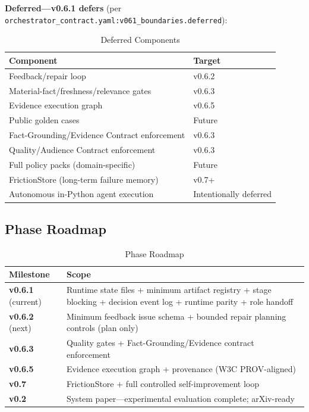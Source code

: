 \documentclass[11pt,a4paper]{article}
\begin{document}
\textbf{Deferred---v0.6.1 defers} (per \texttt{orchestrator\_contract.yaml:v061\_boundaries.deferred}):

\begin{table}[ht]
\centering
\caption{Deferred Components}
\label{tab:deferred}
\begin{tabular}{@{}ll@{}}
\toprule
\textbf{Component} & \textbf{Target} \\
\midrule
Feedback/repair loop & v0.6.2 \\
Material-fact/freshness/relevance gates & v0.6.3 \\
Evidence execution graph & v0.6.5 \\
Public golden cases & Future \\
Fact-Grounding/Evidence Contract enforcement & v0.6.3 \\
Quality/Audience Contract enforcement & v0.6.3 \\
Full policy packs (domain-specific) & Future \\
FrictionStore (long-term failure memory) & v0.7+ \\
Autonomous in-Python agent execution & Intentionally deferred \\
\bottomrule
\end{tabular}
\end{table}

\subsection{Phase Roadmap}

\begin{table}[ht]
\centering
\caption{Phase Roadmap}
\label{tab:roadmap}
\begin{tabular}{@{}lp{9cm}@{}}
\toprule
\textbf{Milestone} & \textbf{Scope} \\
\midrule
\textbf{v0.6.1} (current) & Runtime state files + minimum artifact registry + stage blocking + decision event log + runtime parity + role handoff \\
\textbf{v0.6.2} (next) & Minimum feedback issue schema + bounded repair planning controls (plan only) \\
\textbf{v0.6.3} & Quality gates + Fact-Grounding/Evidence contract enforcement \\
\textbf{v0.6.5} & Evidence execution graph + provenance (W3C PROV-aligned) \\
\textbf{v0.7} & FrictionStore + full controlled self-improvement loop \\
\textbf{v0.2} & System paper---experimental evaluation complete; arXiv-ready \\
\bottomrule
\end{tabular}
\end{table}
\end{document}
